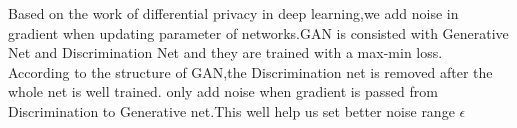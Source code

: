 \documentclass[
    ngerman,american
    ]{scrartcl}
\newcommand{\lang}{en}
\begin{document}
\begin{description}[style=unboxed]
            \item [\questionThree{\lang}]
                \par
                Based on the work of differential privacy in deep learning,we add noise in gradient
                when updating parameter of networks.GAN is consisted with Generative Net and Discrimination
                Net and they are trained with a max-min loss.\\
                According to the structure of GAN,the Discrimination net is removed after the whole net is well trained.
                 only add noise when gradient is passed from Discrimination to Generative net.This well help us set better noise range $\epsilon$



\end{description}
\end{document}
